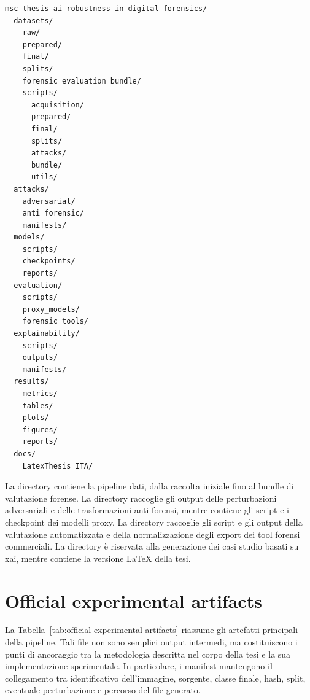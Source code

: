 \begin{lstlisting}[caption={Struttura semplificata della repository sperimentale.}, label={lst:repository-structure}]
msc-thesis-ai-robustness-in-digital-forensics/
  datasets/
    raw/
    prepared/
    final/
    splits/
    forensic_evaluation_bundle/
    scripts/
      acquisition/
      prepared/
      final/
      splits/
      attacks/
      bundle/
      utils/
  attacks/
    adversarial/
    anti_forensic/
    manifests/
  models/
    scripts/
    checkpoints/
    reports/
  evaluation/
    scripts/
    proxy_models/
    forensic_tools/
  explainability/
    scripts/
    outputs/
    manifests/
  results/
    metrics/
    tables/
    plots/
    figures/
    reports/
  docs/
    LatexThesis_ITA/
\end{lstlisting}

La directory  contiene la pipeline dati, dalla raccolta iniziale fino al bundle di valutazione forense. La directory  raccoglie gli output delle perturbazioni adversariali e delle trasformazioni anti-forensi, mentre  contiene gli script e i checkpoint dei modelli proxy. La directory  raccoglie gli script e gli output della valutazione automatizzata e della normalizzazione degli export dei tool forensi commerciali. La directory  è riservata alla generazione dei casi studio basati su \gls{xai}, mentre  contiene la versione LaTeX della tesi.

\section{Official experimental artifacts}
\label{app:official-experimental-artifacts}

La Tabella~\ref{tab:official-experimental-artifacts} riassume gli artefatti principali della pipeline. Tali file non sono semplici output intermedi, ma costituiscono i punti di ancoraggio tra la metodologia descritta nel corpo della tesi e la sua implementazione sperimentale. In particolare, i manifest mantengono il collegamento tra identificativo dell'immagine, sorgente, classe finale, hash, split, eventuale perturbazione e percorso del file generato.

